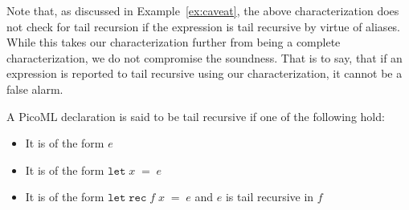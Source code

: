 Note that, as discussed in Example~\ref{ex:caveat}, the above characterization does not check for tail recursion
if the expression is tail recursive by virtue of aliases. While this takes our characterization further from being a complete characterization, 
we do not compromise the soundness. That is to say, that if an expression is reported to tail recursive using our characterization, it cannot be a false alarm.


\begin{definition}
\label{def:dectailrec}
A PicoML declaration is said to be tail recursive if one of the following hold:
\begin{itemize}
 \item It is of the form $e$
 \item It is of the form $\mathtt{let} \; x \; \mathtt{=} \; e$
 \item It is of the form $\mathtt{let} \; \mathtt{rec} \; f \; x \; \mathtt{=} \; e$ and $e$ is tail recursive in $f$
\end{itemize}
\end{definition}
